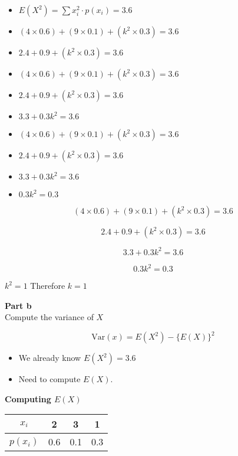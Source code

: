 \documentclass[]{report}
\begin{document}
	
\begin{itemize}
\item $ E(X^2) =  \sum  x^2_i \cdot p(x_i)  = 3.6 $
\item $(4 \times 0.6) + (9\times 0.1) + (k^2\times 0.3) = 3.6 $
\item $2.4 + 0.9 + (k^2\times 0.3) = 3.6 $
\item $(4 \times 0.6) + (9\times 0.1) + (k^2\times 0.3) = 3.6$
\item $2.4 + 0.9 + (k^2\times 0.3) = 3.6 $
\item $ 3.3 + 0.3k^2 = 3.6$

\item $(4 \times 0.6) + (9\times 0.1) + (k^2\times 0.3) = 3.6 $
\item $2.4 + 0.9 + (k^2\times 0.3) = 3.6$
\item $ 3.3 + 0.3k^2 = 3.6$
\item $0.3k^2 =0.3$
\end{itemize}	
	
	
	
	
	
	
	\[(4 \times 0.6) + (9\times 0.1) + (k^2\times 0.3) = 3.6 \]
	
	\[2.4 + 0.9 + (k^2\times 0.3) = 3.6 \]
	
	\[ 3.3 + 0.3k^2 = 3.6\]
	
	\[0.3k^2 =0.3\]
	\begin{center}
		$k^2 = 1$  \qquad Therefore $k=1$
	\end{center}
	
	
	
	
	
	\textbf{Part b}\\
	Compute the variance of $X$
	
	\[ \mbox{Var}(x) = E(X^2) - \{E(X)\}^2 \]
	
	
	\begin{itemize}
		\item We already know $E(X^2) =3.6$
		\item Need to compute $E(X)$.
	\end{itemize}
	
	
	
	
	
	\textbf{Computing $E(X)$}
	\begin{center}
		\begin{tabular}{|c|c|c|c|}
			\hline
			$x_i$ & 2 & 3 & 1 \\ \hline 
			$p(x_i)$ & 0.6 &  0.1 & 0.3 \\ \hline
		\end{tabular}
	\end{center}
	
\end{document}
